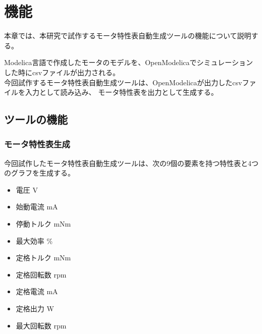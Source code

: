 \chapter{機能}\label{cha:Function}

本章では、本研究で試作するモータ特性表自動生成ツールの機能について説明する。

Modelica言語で作成したモータのモデルを、OpenModelicaでシミュレーションした時にcsvファイルが出力される。\\
今回試作するモータ特性表自動生成ツールは、OpenModelicaが出力したcsvファイルを入力として読み込み、
モータ特性表を出力として生成する。\\









\section{ツールの機能}\label{kinou}
\subsection{モータ特性表生成}\label{sub:kenkyu_mokuteki}
今回試作したモータ特性表自動生成ツールは、次の9個の要素を持つ特性表と4つのグラフを生成する。

\begin{itemize}
	\item 電圧 V
	\item 始動電流 mA
	\item 停動トルク mNm
	\item 最大効率 \%
	\item 定格トルク mNm 
	\item 定格回転数 rpm
	\item 定格電流 mA
	\item 定格出力 W
	\item 最大回転数 rpm 
\end{itemize}

